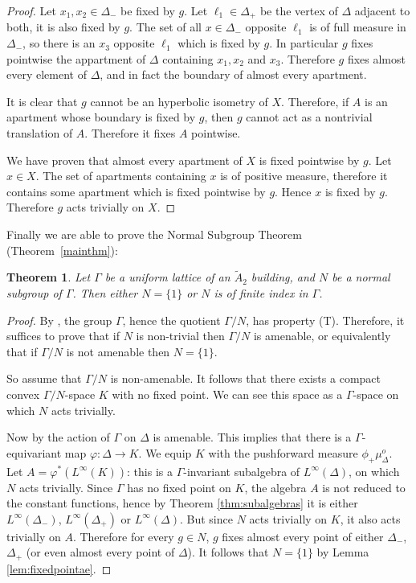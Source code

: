 \documentclass[a4paper, 11pt]{article}
\theoremstyle{plain}
\newtheorem{theorem}[proposition]{Theorem}
\theoremstyle{definition}
\theoremstyle{remark}
\begin{document}
\begin{proof}
Let $x_1,x_2\in \Delta_-$ be fixed by $g$. Let $\ell_1\in \Delta_+$ be the vertex of $\Delta$ adjacent to both, it is also fixed by $g$. The set of all $x\in \Delta_-$ opposite $\ell_1$ is of full measure in $\Delta_-$, so there is an $x_3$ opposite $\ell_1$ which is fixed by $g$. In particular $g$ fixes pointwise the appartment of $\Delta$ containing $x_1,x_2$ and $x_3$. Therefore $g$ fixes almost every element of $\Delta$, and in fact the boundary of almost every apartment.

It is clear that $g$ cannot be an hyperbolic isometry of $X$. Therefore, if $A$ is an apartment whose boundary is fixed by $g$, then $g$ cannot act as a nontrivial translation of $A$. Therefore it fixes $A$ pointwise. 

We have proven that almost every apartment of $X$ is fixed pointwise by $g$. Let $x\in X$. The set of apartments containing $x$ is of positive measure, therefore it contains some apartment which is fixed pointwise by $g$. Hence $x$ is fixed by $g$. Therefore $g$ acts trivially on $X$.
\end{proof}

Finally we are able to prove the Normal Subgroup Theorem (Theorem~\ref{mainthm}):

\begin{theorem}
Let $\Gamma$ be a uniform lattice of an $\tilde A_2$ building, and $N$ be a normal subgroup of $\Gamma$. Then either $N=\{1\}$ or $N$ is of finite index in $\Gamma$.
\end{theorem}


\begin{proof}
By \cite{CartwrightMlotkowski}, the group $\Gamma$, hence the quotient $\Gamma/N$, has property (T). Therefore, it suffices to prove that if $N$ is non-trivial then $\Gamma/N$ is amenable, or equivalently that if $\Gamma/N$ is not amenable then $N=\{1\}$.

So assume that $\Gamma/N$ is non-amenable. It follows that there exists a compact convex $\Gamma/N$-space $K$ with no fixed point. We can see this space as a $\Gamma$-space on which $N$ acts trivially.

Now by \cite{BoundaryAmenability} the action of $\Gamma$ on $\Delta$ is amenable. This implies that there is a $\Gamma$-equivariant map $\varphi:\Delta\to K$. We equip $K$ with the pushforward measure $\phi_+\mu_\Delta^o$. Let $A=\varphi^*(L^\infty(K))$: this is a $\Gamma$-invariant subalgebra of $L^\infty(\Delta)$, on which $N$ acts trivially. Since $\Gamma$ has no fixed point on $K$, the algebra $A$ is not reduced to the constant functions, hence by Theorem \ref{thm:subalgebras} it is either $L^\infty(\Delta_-)$, $L^\infty(\Delta_+)$ or $L^\infty(\Delta)$. But since $N$ acts trivially on $K$, it also acts trivially on $A$. Therefore for every $g\in N$, $g$ fixes almost every point of either $\Delta_-$, $\Delta_+$ (or even almost every point of $\Delta$). It follows that $N=\{1\}$ by Lemma \ref{lem:fixedpointae}.
\end{proof}
\end{document}
